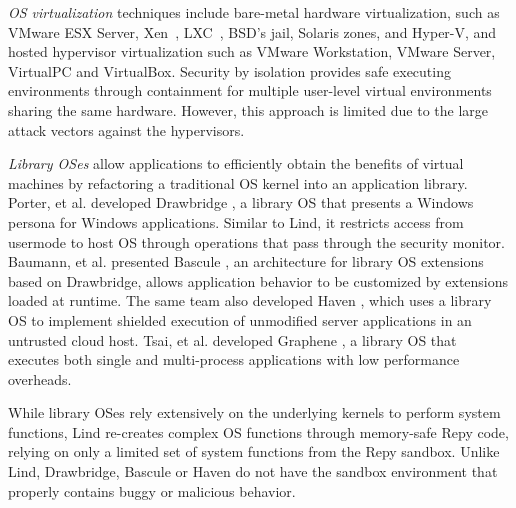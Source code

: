 \textit{OS virtualization}
techniques include
bare-metal hardware virtualization, such as VMware ESX Server, Xen~\cite{Xen-03},
LXC~\cite{LXC}, BSD's jail, Solaris zones, and Hyper-V, and
hosted hypervisor virtualization such as VMware
Workstation, VMware Server, VirtualPC and VirtualBox.
Security by isolation \cite{Qubes, Overshadow, SecureVM, HypSec}
provides safe executing environments through containment for multiple
user-level virtual environments sharing the same hardware.
However, this approach is limited due to
the large attack vectors against the hypervisors.

\textit{Library OSes}
allow applications to efficiently obtain the benefits of virtual machines
by refactoring a traditional OS kernel into an application library.
Porter, et al. developed Drawbridge \cite{Drawbridge-11},
a library OS 
that presents a Windows persona for %
Windows applications. Similar to Lind,
it restricts access from usermode to host OS through 
operations that pass through the security monitor.
%
%
Baumann, et al. presented Bascule \cite{Bascule}, an architecture for library OS extensions
based on Drawbridge, allows application behavior to be customized by
extensions loaded at runtime. The same team also developed Haven \cite{Haven},
which uses a library OS to implement
shielded execution of unmodified server applications
in an untrusted cloud host.
Tsai, et al. developed Graphene \cite{Graphene-14}, a library OS that
executes both single and
multi-process applications with low performance overheads.

While library OSes rely extensively on
the underlying kernels to perform system functions,
Lind re-creates complex OS functions through memory-safe Repy
code, relying on only a limited set of system functions from the Repy
sandbox. Unlike Lind, Drawbridge, Bascule or Haven
do not have the sandbox environment that properly contains
buggy or malicious behavior. 
